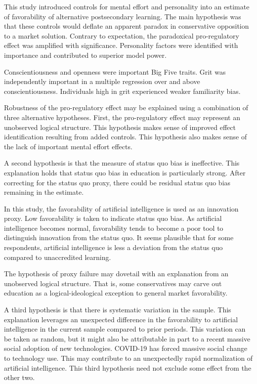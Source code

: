 \documentclass[review]{elsarticle}
\begin{document}
This study introduced controls for mental effort and personality into an estimate of favorability of alternative postsecondary learning.
The main hypothesis was that these controls would deflate an apparent paradox in conservative opposition to a market solution.
Contrary to expectation, the paradoxical pro-regulatory effect was amplified with significance.
Personality factors were identified with importance and contributed to superior model power.

Conscientiousness and openness were important Big Five traits.
Grit was independently important in a multiple regression over and above conscientiousness.
Individuals high in grit experienced weaker familiarity bias.

Robustness of the pro-regulatory effect may be explained using a combination of three alternative hypotheses.
First, the pro-regulatory effect may represent an unobserved logical structure.
This hypothesis makes sense of improved effect identification resulting from added controls.
This hypothesis also makes sense of the lack of important mental effort effects.

A second hypothesis is that the measure of status quo bias is ineffective.
This explanation holds that status quo bias in education is particularly strong.
After correcting for the status quo proxy, there could be residual status quo bias remaining in the estimate.

In this study, the favorability of artificial intelligence is used as an innovation proxy.
Low favorability is taken to indicate status quo bias.
As artificial intelligence becomes normal,
favorability tends to become a poor tool to distinguish innovation from the status quo.
It seems plausible that for some respondents,
artificial intelligence is less a deviation from the status quo
compared to unaccredited learning.

The hypothesis of proxy failure may dovetail with an explanation from an unobserved logical structure.
That is, some conservatives may carve out education as a logical-ideological exception to general market favorability.

A third hypothesis is that there is systematic variation in the sample.
This explanation leverages an unexpected difference in the favorability to artificial intelligence
in the current sample compared to prior periods.
This variation can be taken as random,
but it might also be attributable in part to a recent massive social adoption of new technologies.
COVID-19 has forced massive social change to technology use.
This may contribute to an unexpectedly rapid normalization of artificial intelligence.
This third hypothesis need not exclude some effect from the other two.


\end{document}
